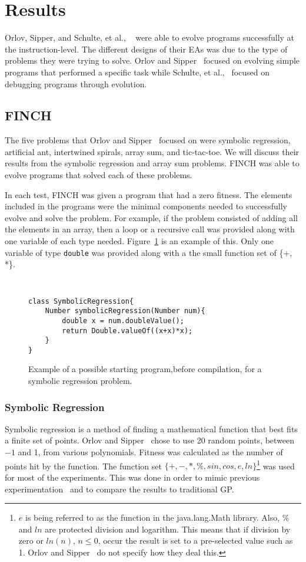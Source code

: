 \documentclass{sig-alternate}
\begin{document}
\section{Results}
Orlov, Sipper, and Schulte, et al., ~\cite{FINCH:2011, Assembly:2010} were able to evolve programs successfully at the instruction-level. The different designs of their EAs was due to the type of problems they were trying to solve. Orlov and Sipper~\cite{FINCH:2011} focused on evolving simple programs that performed a specific task while Schulte, et al.,~\cite{Assembly:2010} focused on debugging programs through evolution.

\subsection{FINCH}
The five problems that Orlov and Sipper~\cite{Assembly:2010} focused on were symbolic regression, artificial ant, intertwined spirals, array sum, and tic-tac-toe. We will discuss their results from the symbolic regression and array sum problems. FINCH was able to evolve programs that solved each of these problems.

In each test, FINCH was given a program that had a zero fitness. The elements included in the programs were the minimal components needed to successfully evolve and solve the problem. For example, if the problem consisted of adding all the elements in an array, then a loop or a recursive call was provided along with one variable of each type needed. Figure~\ref{regression} is an example of this. Only one variable of type \texttt{double} was provided along with a the small function set of \{+, *\}.

\begin{figure}
\centering
{\tt
\begin{verbatim}
class SymbolicRegression{
    Number symbolicRegression(Number num){
        double x = num.doubleValue();
        return Double.valueOf((x+x)*x);
    }
}
\end{verbatim}
}
\caption{Example of a possible starting program,before compilation, for a symbolic regression problem.}
\label{regression}
\end{figure}
\subsubsection{Symbolic Regression}
Symbolic regression is a method of finding a mathematical function that best fits a finite set of points. Orlov and Sipper~\cite{FINCH:2011} chose to use 20 random points, between ${-1}$ and 1, from various polynomials. Fitness was calculated as the number of points hit by the function. The function set ${\{+, -, *, \%, sin, cos, e, ln\}}$\footnote{$e$ is being referred to as the function in the java.lang.Math library. Also, $\%$ and $ln$ are protected division and logarithm. This means that if division by zero or $ln(n)$, $n \le 0$, occur the result is set to a pre-selected value such as 1. Orlov and Sipper~\cite{FINCH:2011} do not specify how they deal this.} was used for most of the experiments. This was done in order to mimic previous experimentation~\cite{koza:1992} and to compare the results to traditional GP.
\end{document}
